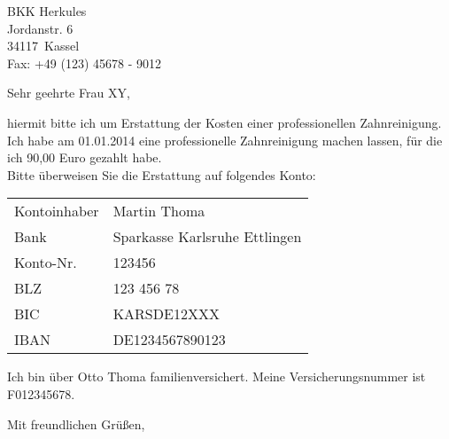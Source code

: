 \documentclass[a4paper, 12pt, KOMAold]{scrlttr2}
\newcommand{\Vorname}{Martin}     %
\newcommand{\VornameVater}{Otto}  %
\newcommand{\Nachname}{Thoma}     %
\newcommand{\Kundennr}{F012345678}%
\newcommand{\Bank}{Sparkasse Karlsruhe Ettlingen}                   %
\newcommand{\KontoNr}{123456}                                       %
\newcommand{\BLZ}{123 456 78}                                       %
\newcommand{\BIC}{KARSDE12XXX}                                      %
\newcommand{\IBAN}{DE1234567890123}                                 %
\newcommand{\EmpfaengerName}{Frau XY}       %
\newcommand{\Empfaenger}{BKK Herkules }     %
\newcommand{\EStrasse}{Jordanstr. 6 }       %
\newcommand{\EPLZ}{34117}                   %
\newcommand{\EOrt}{Kassel}                  %
\newcommand{\EFax}{+49 (123) 45678 - 9012}  %
\newcommand{\DocTitle}{Erstattung: Professionelle Zahnreinigung} %
\newcommand{\DatumZahnreinigung}{01.01.2014}                        %
\newcommand{\GeldZahnreinigung}{90,00 Euro}                         %
\begin{document}
    \begin{letter}{\Empfaenger \\ \EStrasse \\ \EPLZ~\EOrt \\ Fax: \EFax }
    \date{\today}%
    \subject{\DocTitle}
    \opening{Sehr geehrte \EmpfaengerName{},}
    hiermit bitte ich um Erstattung der Kosten einer professionellen
    Zahnreinigung.\\

    \noindent{}Ich habe am \DatumZahnreinigung{} eine professionelle Zahnreinigung machen
    lassen, für die ich \GeldZahnreinigung{} gezahlt habe.\\

    \noindent{}Bitte überweisen Sie die Erstattung auf folgendes Konto:

    \begin{tabular}{ll}
    Kontoinhaber & \Vorname{} \Nachname{}        \\
    Bank         & \Bank     \\
    Konto-Nr.    & \KontoNr  \\
    BLZ          & \BLZ      \\
    BIC          & \BIC      \\
    IBAN         & \IBAN     \\
    \end{tabular}

    Ich bin über \VornameVater{} \Nachname{} familienversichert. Meine
    Versicherungsnummer ist \Kundennr{}.

    \closing{Mit freundlichen Grüßen,}
    \end{letter}
\end{document}
